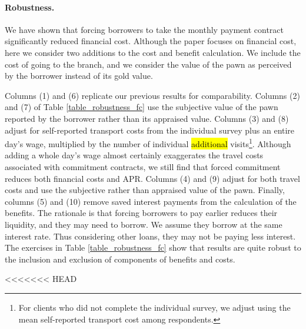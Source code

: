 \documentclass[oneside,11pt]{article}
\begin{document}

\paragraph{Robustness.} We have shown that forcing borrowers to take the monthly payment contract significantly reduced financial cost. Although the paper focuses on financial cost, here we consider two additions to the cost and benefit calculation. We include the cost of going to the branch, and we consider the value of the pawn as perceived by the borrower instead of its gold value.

Columns (1) and (6) replicate our previous results for comparability. Columns (2) and (7) of Table \ref{table_robustness_fc} use the subjective value of the pawn reported by the borrower rather than its appraised value. Columns (3) and (8) adjust for self-reported transport costs from the individual survey plus an entire day's wage, multiplied by the number of individual \hl{additional} visits\footnote{For clients who did not complete the individual survey, we adjust using the mean self-reported transport cost among respondents.}.
Although adding a whole day's wage almost certainly exaggerates the travel costs associated with commitment contracts, we still find that forced commitment reduces both financial costs and APR. 
Columns (4) and (9) adjust for both travel costs and use the subjective rather than appraised value of the pawn. Finally, columns (5) and (10) remove saved interest payments from the calculation of the benefits. The rationale is that forcing borrowers to pay earlier reduces their  liquidity, and they may need to borrow. We assume they borrow at the same interest rate. Thus considering other loans, they may not be paying less interest. The exercises in Table \ref{table_robustness_fc} show that results are quite robust to the inclusion and exclusion of components of benefits and costs.

<<<<<<< HEAD
\end{document}
